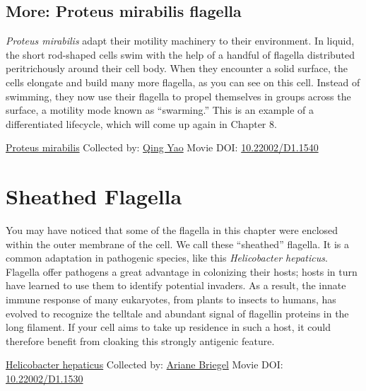 \documentclass[]{tufte-book}
\begin{document}
\hypertarget{Proteus_mirabilis_flagella}{%
\subsection*{More: Proteus mirabilis flagella}\label{Proteus_mirabilis_flagella}}

\emph{Proteus mirabilis} adapt their motility machinery to their environment. In liquid, the short rod-shaped cells swim with the help of a handful of flagella distributed peritrichously around their cell body. When they encounter a solid surface, the cells elongate and build many more flagella, as you can see on this cell. Instead of swimming, they now use their flagella to propel themselves in groups across the surface, a motility mode known as ``swarming.'' This is an example of a differentiated lifecycle, which will come up again in Chapter 8.



\hypertarget{htmlwidget-cc19fb7925d44b24ed0a}{}

\label{fig:6-5a}\protect\hyperlink{tree}{Proteus mirabilis} Collected by: \protect\hyperlink{qing_yao}{Qing Yao} Movie DOI: \href{https://doi.org/10.22002/D1.1540}{10.22002/D1.1540}

\hypertarget{sheathed-flagella}{%
\section{Sheathed Flagella}\label{sheathed-flagella}}

You may have noticed that some of the flagella in this chapter were enclosed within the outer membrane of the cell. We call these ``sheathed'' flagella. It is a common adaptation in pathogenic species, like this \emph{Helicobacter hepaticus}. Flagella offer pathogens a great advantage in colonizing their hosts; hosts in turn have learned to use them to identify potential invaders. As a result, the innate immune response of many eukaryotes, from plants to insects to humans, has evolved to recognize the telltale and abundant signal of flagellin proteins in the long filament. If your cell aims to take up residence in such a host, it could therefore benefit from cloaking this strongly antigenic feature.



\hypertarget{htmlwidget-ae22dc6422e4f6cf5332}{}

\label{fig:6-6}\protect\hyperlink{tree}{Helicobacter hepaticus} Collected by: \protect\hyperlink{ariane_briegel}{Ariane Briegel} Movie DOI: \href{https://doi.org/10.22002/D1.1530}{10.22002/D1.1530}
\end{document}
